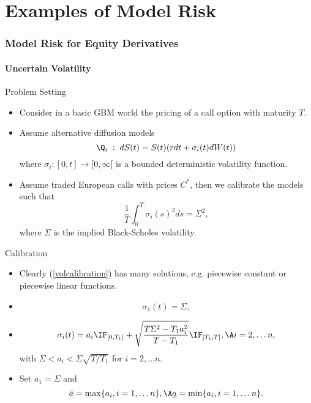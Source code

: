 
\part{Examples of Model Risk}

\section{Model Risk for Equity Derivatives}
\subsection{Uncertain Volatility}

{Problem Setting}
\begin{itemize}
\item<1-> Consider in a basic GBM world the pricing of a call option with maturity $T$.
\item<2-> Assume alternative diffusion models
\begin{equation}
\Q_i\;:\; dS(t) = S(t)(r dt + \sigma_i(t) dW(t))
\end{equation}
where $ \sigma_i: [0,t] \rightarrow [0, \infty[ $ is a bounded deterministic volatility function.
\item<3->
Assume traded European calls with prices $C^*$, then we calibrate the models such that
\begin{equation}\label{volcalibration}
\frac{1}{T} \int_0^T  \sigma_i(s)^2 ds = \Sigma^2,
\end{equation}
where $\Sigma$ is the implied Black-Scholes volatility.
\end{itemize}

{Calibration}
\begin{itemize}
\item<1-> Clearly (\ref{volcalibration}) has many solutions, e.g. piecewise constant or piecewise linear functions.
\item<2->
$$
\sigma_1(t) = \Sigma,
$$
\item<3->
$$
\sigma_i(t) = a_i \IF_{[0,T_1]}+ \sqrt{\frac{T\Sigma^2 -T_1a_i^2}{T-T_1}}\IF_{]T_1, T]}, \A i=2, \ldots n,
$$
with $\Sigma < a_i < \Sigma \sqrt{T/T_1}$ for  $ i =2, \ldots n$.
\item<4->
Set $a_1 = \Sigma$ and
$$
\bar{a}=\max\{a_i, i=1, \ldots n\}, \A \underline{a}=\min\{a_i, i=1, \ldots n\}.
$$
\end{itemize}

